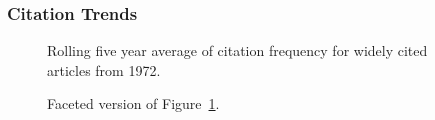 \documentclass[
  10pt,
  letterpaper,
  DIV=11,
  numbers=noendperiod,
  twoside]{scrartcl}
\begin{document}
\subsubsection*{Citation Trends}\label{sec-trends-1972}

\begin{figure}


\caption{\label{fig-citation-spaghetti-1972}Rolling five year average of
citation frequency for widely cited articles from 1972.}

\end{figure}%

\begin{figure}


\caption{\label{fig-citation-facet-1972}Faceted version of
Figure~\ref{fig-citation-spaghetti-1972}.}

\end{figure}%
\end{document}
